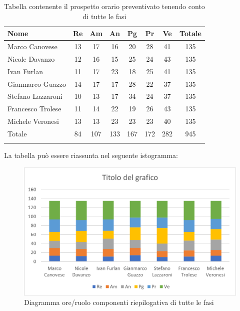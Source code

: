 \begin{longtable}{|l|c|c|c|c|c|c|c|}
	\hline
	\rowcolor{lighter-grayer}
	\textbf{Nome}     & \textbf{Re} & \textbf{Am} & \textbf{An} & \textbf{Pg} & \textbf{Pr} & \textbf{Ve} & \textbf{Totale} \\
	\hline
	\endfirsthead

	\hline
	Marco Canovese    & 13          & 17          & 16          & 20          & 28          & 41          & 135             \\
	\hline
	\hline
	Nicole Davanzo    & 12          & 16          & 15          & 25          & 24          & 43          & 135             \\
	\hline
	\hline
	Ivan Furlan       & 11          & 17          & 23          & 18          & 25          & 41          & 135             \\
	\hline
	\hline
	Gianmarco Guazzo  & 14          & 17          & 17          & 28          & 22          & 37          & 135             \\
	\hline
	\hline
	Stefano Lazzaroni & 10          & 13          & 17          & 34          & 24          & 37          & 135             \\
	\hline
	\hline
	Francesco Trolese & 11          & 14          & 22          & 19          & 26          & 43          & 135             \\
	\hline
	\hline
	Michele Veronesi  & 13          & 13          & 23          & 23          & 23          & 40          & 135             \\
	\hline
	\hline
	Totale            & 84          & 107         & 133         & 167         & 172         & 282         & 945             \\
	\hline
	\rowcolor{white}
	\caption{Tabella contenente il prospetto orario preventivato tenendo conto di tutte le fasi}
\end{longtable}


La tabella può essere riassunta nel seguente istogramma:

\begin{figure}[H]
	\centering
	\includegraphics[width=0.8\linewidth]{res/images/preventivo/tot1.png}
	\caption{Diagramma ore/ruolo componenti riepilogativa di tutte le fasi}
	\label{fig:diagramma suddivisione ruoli riepilogativa di tutte le fasi}
\end{figure}

